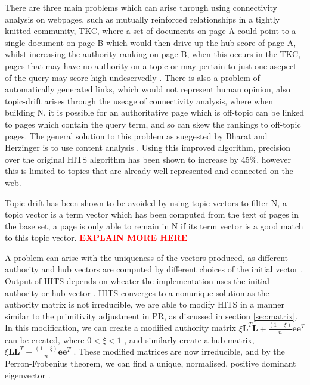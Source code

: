 \documentclass[11pt]{report}
\begin{document}
There are three main problems which can arise through using connectivity analysis on webpages, such as mutually reinforced relationships in a tightly knitted community, TKC, where a set of documents on page A could point to a single document on page B which would then drive up the hub score of page A, whilst increasing the authority ranking on page B, when this occurs in the TKC, pages that may have no authority on a topic or may pertain to just one ascpect of the query may score high undeservedly \cite{lempel2000stochastic}. There is also a problem of automatically generated links, which would not represent human opinion, also topic-drift arises through the useage of connectivity analysis, where when building N, it is possible for an authoritative page which is off-topic can be linked to pages which contain the query term, and so can skew the rankings to off-topic pages. The general solution to this problem as suggested by Bharat and Herzinger is to use content analysis \cite{bharat1998improved}. Using this improved algorithm, precision over the original HITS algorithm has been shown to increase by 45\%, however this is limited to topics that are already well-represented and connected on the web. 

Topic drift has been shown to be avoided by using topic vectors to filter N, a topic vector is a term vector which has been computed from the text of pages in the base set, a page is only able to remain in N if its term vector is a good match to this topic vector. \textcolor{red}{\textbf{EXPLAIN MORE HERE}}

A problem can arise with the uniqueness of the vectors produced, as different authority and hub vectors are computed by different choices of the initial vector \cite{langville}. Output of HITS depends on wheater the implementation uses the initial authority or hub vector \cite{farahat2006authority}. HITS converges to a nonunique solution as the authority matrix is not irreducible, we are able to modify HITS in a manner similar to the primitivity adjustment in PR, as discussed in section \ref{sec:matrix}. In this modification, we can create a modified authority matrix \(\xi\textbf{L}^T\textbf{L} +\frac{(1-\xi)}{n}\textbf{ee}^T\) can be created, where $0<\xi<1$ \cite{ng2001stable}, and similarly create a hub matrix, \(\xi\textbf{LL}^T +\frac{(1-\xi)}{n}\textbf{ee}^T\) . These modified matrices are now irreducible, and by the Perron-Frobenius theorem, we can find a unique, normalised, positive dominant eigenvector \cite{meyer2000matrix}. 
\end{document}
